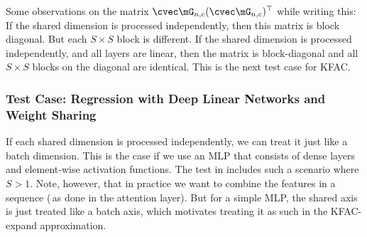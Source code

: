 Some observations on the matrix $\cvec \mG_{n,c} (\cvec \mG_{n,c})^{\top}$ while writing this: If the shared dimension is processed independently, then this matrix is block diagonal.
But each $S \times S$ block is different.
If the shared dimension is processed independently, and all layers are linear, then the matrix is block-diagonal and all $S \times S$ blocks on the diagonal are identical.
This is the next test case for KFAC.

\subsubsection{Test Case: Regression with Deep Linear Networks and Weight Sharing}\label{sec:expand_sharing}

If each shared dimension is processed independently, we can treat it just like a batch dimension.
This is the case if we use an MLP that consists of dense layers and element-wise activation functions.
The test in  includes such a scenario where $S > 1$.
Note, however, that in practice we want to combine the features in a sequence (\eg\,as done in the attention layer).
But for a simple MLP, the shared axis is just treated like a batch axis, which motivates treating it as such in the KFAC-expand approximation.

